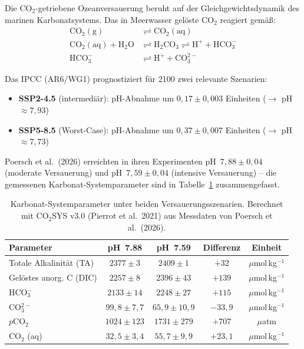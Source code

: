 ﻿\documentclass[12pt,a4paper]{article}
\theoremstyle{definition}
\theoremstyle{remark}
\begin{document}
Die CO$_2$-getriebene Ozeanversauerung beruht auf der Gleichgewichtsdynamik des
marinen Karbonatsystems. Das in Meerwasser gel\"oste CO$_2$ reagiert gem\"a\ss{}:
\begin{align}
  \text{CO}_2(\text{g}) &\rightleftharpoons \text{CO}_2(\text{aq}) \label{eq:co2_dissolution}\\
  \text{CO}_2(\text{aq}) + \text{H}_2\text{O} &\rightleftharpoons
    \text{H}_2\text{CO}_3 \rightleftharpoons \text{H}^+ + \text{HCO}_3^-
    \label{eq:co2_hydration}\\
  \text{HCO}_3^- &\rightleftharpoons \text{H}^+ + \text{CO}_3^{2-}
    \label{eq:bicarbonate}
\end{align}

Das IPCC (AR6/WG1) prognostiziert f\"ur 2100 zwei relevante Szenarien:
\begin{itemize}[noitemsep]
  \item \textbf{SSP2-4.5} (intermedi\"ar): pH-Abnahme um
    $0{,}17 \pm 0{,}003$ Einheiten ($\to$ pH $\approx 7{,}93$)
  \item \textbf{SSP5-8.5} (Worst-Case): pH-Abnahme um
    $0{,}37 \pm 0{,}007$ Einheiten ($\to$ pH $\approx 7{,}73$)
\end{itemize}

Poersch et al.\ (2026) erreichten in ihren Experimenten
pH~$7{,}88 \pm 0{,}04$ (moderate Versauerung) und
pH~$7{,}59 \pm 0{,}04$ (intensive Versauerung) -- die gemessenen
Karbonat-Systemparameter sind in Tabelle~\ref{tab:karbonat} zusammengefasst.

\begin{table}[H]
  \centering
  \caption{Karbonat-Systemparameter unter beiden Versauerungsszenarien.
           Berechnet mit CO$_2$SYS v3.0 (Pierrot et al.\ 2021) aus
           Messdaten von Poersch et al.\ (2026).}
  \label{tab:karbonat}
  \begin{tabular}{lcccc}
    \toprule
    Parameter & pH~7.88 & pH~7.59 & Differenz & Einheit \\
    \midrule
    Totale Alkalinit\"at (TA)     & $2377 \pm 3$      & $2409 \pm 1$  & $+32$   & $\mu$mol\,kg$^{-1}$ \\
    Gel\"ostes anorg. C (DIC)     & $2257 \pm 8$      & $2396 \pm 43$ & $+139$  & $\mu$mol\,kg$^{-1}$ \\
    HCO$_3^-$                     & $2133 \pm 14$     & $2248 \pm 27$ & $+115$  & $\mu$mol\,kg$^{-1}$ \\
    CO$_3^{2-}$                   & $99{,}8 \pm 7{,}7$ & $65{,}9 \pm 10{,}9$ & $-33{,}9$ & $\mu$mol\,kg$^{-1}$ \\
    $p$CO$_2$                     & $1024 \pm 123$    & $1731 \pm 279$ & $+707$ & $\mu$atm \\
    CO$_2$ (aq)                   & $32{,}5 \pm 3{,}4$ & $55{,}7 \pm 9{,}9$ & $+23{,}1$ & $\mu$mol\,kg$^{-1}$ \\
    \bottomrule
  \end{tabular}
\end{table}
\end{document}
